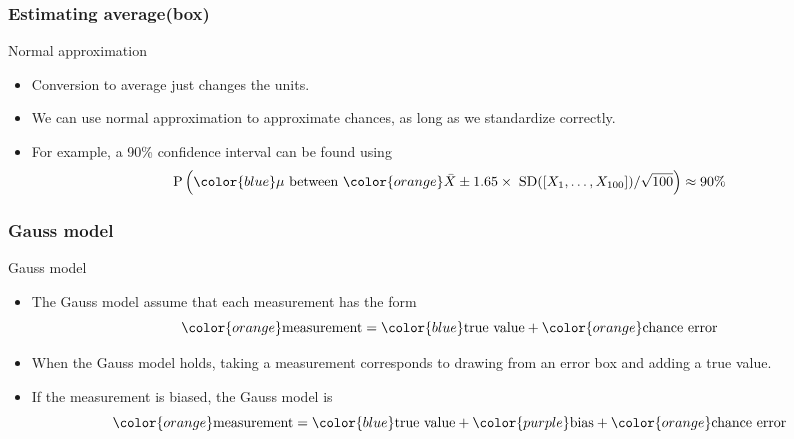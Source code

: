 \documentclass[handout]{beamer}
\begin{document}

   \begin{frame} \frametitle{Estimating {\color{blue} average({\bf box})}}

   \begin{block}
   {Normal approximation}
   \begin{itemize}
   \item Conversion to average just changes the units.
   \item We can use normal approximation to approximate chances,
   as long as we standardize correctly.
   \item For example, a 90\% confidence interval can be found using
   $$
   \begin{aligned}
   \text{P} \left(\text{${\color{blue} \mu}$ between ${\color{orange} \bar{X} \pm 1.65 \times \; \text{SD}([X_1, \dots, X_{100}]) / \sqrt{100}}$}\right) &\approx 90\% \\
   \end{aligned}
   $$

   \end{itemize}
   \end{block}
   \end{frame}


   \begin{frame} \frametitle{Gauss model}

   \begin{block}
     {Gauss model}
     \begin{itemize}
     \item The Gauss model assume that each measurement has the form
     $$
     {\color{orange} \text{measurement}} = {\color{blue} \text{true value}} + {\color{orange} \text{chance error}}
     $$
     \item When the Gauss model holds, taking a measurement corresponds
     to drawing from an {\color{orange} error box} and adding
     a {\color{blue} true value}.

     \item If the measurement is biased, the Gauss model is
     $$
     {\color{orange} \text{measurement}} = {\color{blue} \text{true value}} + {\color{purple} \text{bias}} + {\color{orange} \text{chance error}}
     $$

     \end{itemize}
   \end{block}
   \end{frame}
\end{document}
